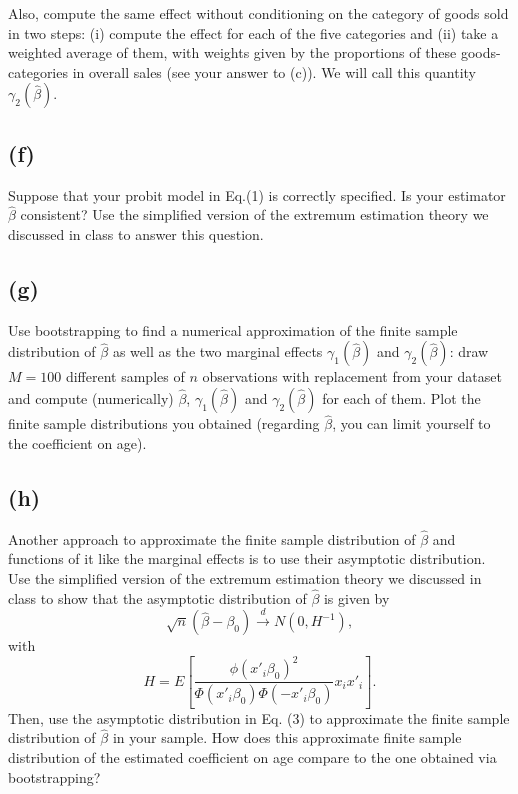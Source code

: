 \documentclass[a4paper,12pt]{article} %
\theoremstyle{nonitalic}
\begin{document}
Also, compute the same effect without conditioning on the category of goods 
sold in two steps: 
(i) compute the effect for each of the five categories and
(ii)  take a weighted average of them, with weights given by 
the proportions of these goods-categories in overall sales 
(see your answer to (c)).
We will call this quantity $\gamma_2(\hat{\beta})$.

\subsection*{(f)}
Suppose that your probit model in Eq.(1) is correctly specified. Is your estimator $\hat{\beta}$ consistent? Use the simplified version of the extremum estimation theory we discussed in class to answer this question.

\subsection*{(g)}
Use bootstrapping to find a numerical approximation of the finite sample distribution of $\hat{\beta}$ 
as well as the two marginal effects 
$\gamma_1(\hat{\beta})$ and $\gamma_2(\hat{\beta})$: 
draw $M = 100$ different samples of $n$ observations with replacement 
from your dataset and compute (numerically) $\hat{\beta}$, 
$\gamma_1(\hat{\beta})$ and $\gamma_2(\hat{\beta})$ for each of them. 
Plot the finite sample distributions you obtained 
(regarding $\hat{\beta}$, 
you can limit yourself to the coefficient on age).

\subsection*{(h)}
Another approach to approximate the finite sample distribution of $\hat{\beta}$ and functions of it like the marginal effects is to use their asymptotic distribution. Use the simplified version of the extremum estimation theory we discussed in class to show that the asymptotic distribution of $\hat{\beta}$ is given by
\[
\sqrt{n}(\hat{\beta} - \beta_0) \overset{d}{\to} N\left(0, H^{-1}\right),
\]
with 
\begin{equation}
    H = E\left[ \frac{\phi(x'_i \beta_0)^2}{\Phi(x'_i \beta_0)\Phi(-x'_i \beta_0)} x_i x'_i \right]. 
\end{equation}
Then, use the asymptotic distribution in Eq. (3) to approximate the finite sample distribution of $\hat{\beta}$ in your sample.
How does this approximate finite sample distribution of the estimated coefficient on age compare to the one obtained via bootstrapping?
\end{document}
